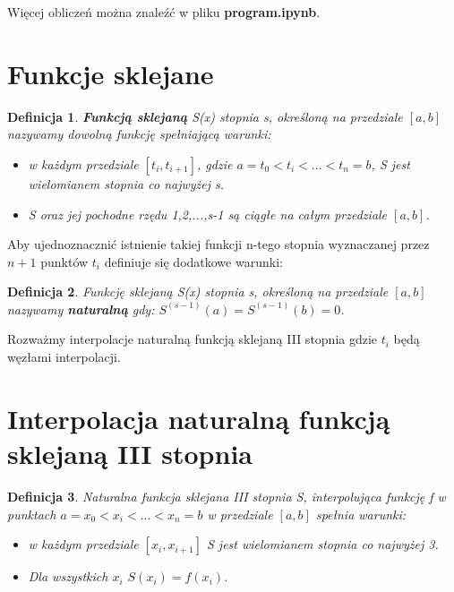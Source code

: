 \documentclass{article}
\newtheorem{defi}{Definicja}
\begin{document}
Więcej obliczeń można znaleźć w pliku \textbf{program.ipynb}.

\section{Funkcje sklejane}


\begin{defi}
	\textbf{Funkcją sklejaną} S(x) stopnia s, określoną na przedziale $[a,b]$ nazywamy dowolną funkcję spełniającą warunki:
	
	\begin{itemize}
		\item w każdym przedziale $[t_i,t_{i+1}]$, gdzie $a = t_0 < t_i <...<t_n = b$, S jest wielomianem stopnia co najwyżej s.
		\item S oraz jej pochodne rzędu 1,2,...,s-1 są ciągłe na całym przedziale $[a,b]$.
	\end{itemize}
\end{defi}

\noindent Aby ujednoznacznić istnienie takiej funkcji n-tego stopnia wyznaczanej przez $n+1$ punktów $t_i$ definiuje się dodatkowe warunki:

\begin{defi}
	Funkcję sklejaną S(x) stopnia s, określoną na przedziale $[a,b]$
	nazywamy \textbf{naturalną} gdy:
	$S^{(s-1)}(a) = S^{(s-1)}(b) = 0$.
\end{defi}

Rozważmy interpolacje naturalną funkcją sklejaną III stopnia gdzie $t_i$ będą węzłami interpolacji.

\section{Interpolacja naturalną funkcją sklejaną III stopnia}

\begin{defi}
	Naturalna funkcja sklejana III stopnia S, interpolująca funkcję f w punktach $a = x_0 < x_i <...<x_n = b$ w przedziale $[a,b]$ spełnia warunki:
	
	\begin{itemize}
		\item w każdym przedziale $[x_i,x_{i+1}]$ S jest wielomianem stopnia co najwyżej 3.
		\item Dla wszystkich $x_i$ $S(x_i) = f(x_i)$.
	\end{itemize}
	
\end{defi}
\end{document}
